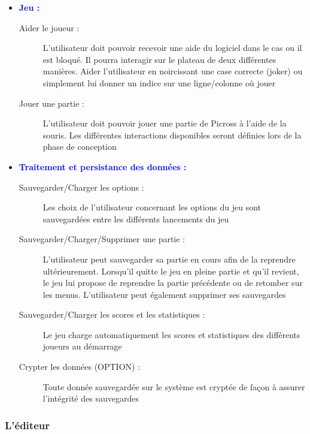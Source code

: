 \documentclass[a4paper, 12pt, twoside]{article}
\begin{document}
\begin{itemize}
 \item[\textbullet] \textbf{\textcolor{blue}{Jeu : \newline}}
 \begin{description}
    \item[Aider le joueur :]  L'utilisateur doit pouvoir recevoir une aide du logiciel dans le cas ou il est bloqué. Il pourra interagir sur le  plateau de deux différentes manières. Aider l'utilisateur en noircissant une case correcte (joker) ou simplement lui donner un indice sur une ligne/colonne où jouer
     \item[Jouer une partie :] L'utilisateur doit pouvoir jouer une partie de Picross à l'aide de la souris. Les différentes interactions disponibles seront définies lors de la phase de conception\newline
  \end{description}
  
  \item[\textbullet] \textbf{\textcolor{blue}{Traitement et persistance des données : \newline}}
 \begin{description}
    \item[Sauvegarder/Charger les options :] Les choix de l'utilisateur concernant les options du jeu sont sauvegardées entre les différents lancements du jeu
    \item[Sauvegarder/Charger/Supprimer une partie :] L'utilisateur peut sauvegarder sa partie en cours afin de la reprendre ultérieurement. Lorsqu'il quitte le jeu en pleine partie et qu'il revient, le jeu lui propose de reprendre la partie précédente ou de retomber sur les menus. L'utilisateur peut également supprimer ses sauvegardes
    \item[Sauvegarder/Charger les scores et les statistiques :] Le jeu charge automatiquement les scores et statistiques des différents joueurs au démarrage
    \item[Crypter les données (OPTION) :] Toute donnée sauvegardée sur le système est cryptée de façon à assurer l'intégrité des sauvegardes
  \end{description}
\end{itemize}

\subsubsection*{L'éditeur}
\end{document}
